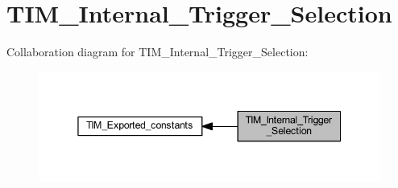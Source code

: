 \hypertarget{group___t_i_m___internal___trigger___selection}{}\section{T\+I\+M\+\_\+\+Internal\+\_\+\+Trigger\+\_\+\+Selection}
\label{group___t_i_m___internal___trigger___selection}
Collaboration diagram for T\+I\+M\+\_\+\+Internal\+\_\+\+Trigger\+\_\+\+Selection\+:
\nopagebreak
\begin{figure}[H]
\begin{center}
\leavevmode
\includegraphics[width=345pt]{group___t_i_m___internal___trigger___selection}
\end{center}
\end{figure}
